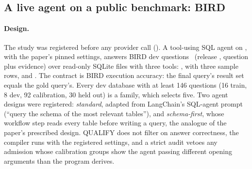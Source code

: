 

\subsection{A live agent on a public benchmark: BIRD}
\label{app:bird}

\paragraph{Design.} The study was registered before any provider call
(). A tool-using SQL agent
on , with the paper's pinned settings, answers BIRD dev
questions~\citep{li2023bird} (release , question plus
evidence) over read-only SQLite files with three tools: ,
 with three sample rows, and .
The contract is BIRD execution accuracy: the final query's result set equals
the gold query's. Every dev database with at least 146 questions (16 train, 8
dev, 92 calibration, 30 held out) is a family, which selects five. Two agent
designs were registered: \emph{standard}, adapted from LangChain's SQL-agent
prompt \citep{langchain2026sql} (``query the schema of the most relevant tables''), and
\emph{schema-first}, whose workflow step reads every table before writing a
query, the analogue of the paper's prescribed design. QUALIFY does not filter
on answer correctness, the compiler runs with the registered settings, and a
strict audit vetoes any admission whose calibration groups show the agent
passing different opening arguments than the program derives.

\begin{table}[t]
  \centering
  \caption{BIRD: compile-or-retire per database and design, and the schema-first
  held-out evaluation (30 sealed questions per database). ``Repeat'' is a
  second independent run of the unchanged agent. Reductions compare the
  compiled agent with that warm-cache repeat run (the condition order was not
  rotated as registered; see text). Standard-design retirements are at
  synthesis () or on calibration support.}
  \label{tab:bird}
  \footnotesize
  \setlength{\tabcolsep}{3pt}
  \resizebox{\linewidth}{!}{}
\end{table}

